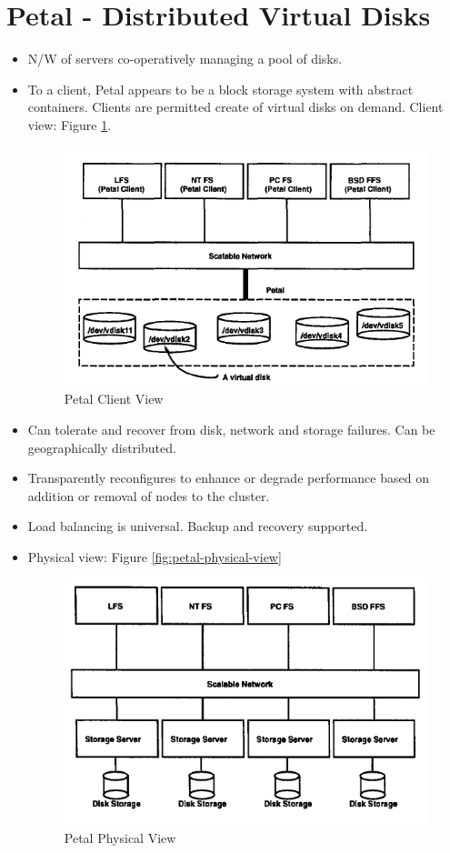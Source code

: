 \documentclass[parskip=half]{scrartcl}
\begin{document}
\newpage


\section{Petal - Distributed Virtual Disks} %
\label{sec:petal_distributed_virtual_disks}

    \begin{itemize}
        \item
        N/W of servers co-operatively managing a pool of disks.
        \item
        To a client, Petal appears to be a block storage system with abstract containers. Clients are permitted create of virtual disks on demand. Client view: Figure \ref{fig:petal-client-view}.
        \begin{figure}[ht]
            \centering
            \includegraphics[width=.4\textwidth]{petal-client-view}
            \caption{Petal Client View}
            \label{fig:petal-client-view}
        \end{figure}
        \item
        Can tolerate and recover from disk, network and storage failures. Can be geographically distributed.
        \item
        Transparently reconfigures to enhance or degrade performance based on addition or removal of nodes to the cluster.
        \item
        Load balancing is universal. Backup and recovery supported.
        \item
        Physical view: Figure \ref{fig:petal-physical-view}
        \begin{figure}[ht]
            \centering
            \includegraphics[width=.4\textwidth]{petal-physical-view}
            \caption{Petal Physical View}

\end{figure}
\end{itemize}
\end{document}
